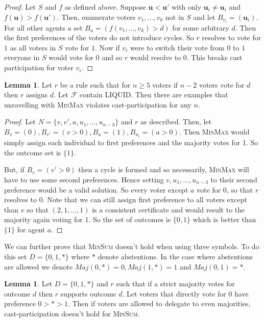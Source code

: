 \documentclass[11pt,a4paper, titlepage]{article}
\theoremstyle{definition}
\newtheorem{lemma}[theorem]{Lemma}
\let\vec\mathbf
\begin{document}
\begin{proof}
    Let $S$ and $f$ as defined above. Suppose $\vec{u} < \vec{u}'$ with only $\vec{u}_i \neq \vec{u}_i$ and $f(\vec{u}) > f(\vec{u}')$. Then, enumerate voters $v_1, \ldots, v_k$ not in $S$ and let $B_{v_i} = (\vec{u}_i)$. For all other agents $a$ set $B_{a} = (f(v_1, \ldots, v_k) > d)$ for some arbitrary $d$. 
    Then the first preferences of the voters do not introduce cycles. So
     $r$ resolves to vote for $1$ as all voters in $S$ vote for $1$.
    Now if $v_i$ were to switch their vote from $0$ to $1$ everyone in $S$ would vote for $0$ and so $r$ would resolve to $0$. This breaks cast participation for voter $v_i$.
\end{proof}

\begin{lemma}
    Let $r$ be a rule such that for $n \geq 5$ voters if $n-2$ voters vote for $d$ then $r$ assigns $d$. Let $\mathcal{F}$ contain LIQUID. Then there are examples that unravelling with \textsc{MinMax} violates cast-participation for any $n$.
\end{lemma}

\begin{proof}
    Let $N = \{v, v', a, u_1, \ldots, u_{n-3}\}$ and $r$ as described. Then, let $B_v = (0), B_{v'} = (v > 0), B_a = (1), B_{u_i} = (a > 0)$. Then \textsc{MinMax} would simply assign each individual to first preferences and the majority votes for 1. So the outcome set is $\{1\}$.

    But, if $B_v = (v' > 0)$ then a cycle is formed and so necessarily, \textsc{MinMax} will have to use some second preferences. Hence setting $v, u_1, \ldots, u_{n-3}$ to their second preference would be a valid solution. So every voter except $a$ vote for $0$, so that $r$ resolves to $0$. 
    Note that we can still assign first preference to all voters except than $v$ so that $(2, 1, \ldots, 1)$ is a consistent certificate and would result to the majority again voting for 1. So the set of outcomes is $\{0, 1\}$ which is better than $\{1\}$ for agent $a$.
\end{proof}

We can further prove that \textsc{MinSum} doesn't hold when using three symbols. To do this set $D = \{0, 1, *\}$ where $*$ denote abstentions.
In the case where abstentions are allowed we denote $\mathit{Maj}(0, *) = 0, \mathit{Maj}(1, *) = 1$ and $\mathit{Maj}(0, 1) = *$.

\begin{lemma}
    Let $D = \{0, 1, *\}$ and $r$ such that if a strict majority votes for outcome $d$ then $r$ supports outcome $d$. Let voters that directly vote for $0$ have preference $0 > * > 1$. Then if voters are allowed to delegate to even majorities, cast-participation doesn't hold for \textsc{MinSum}. 
\end{lemma}
\end{document}

